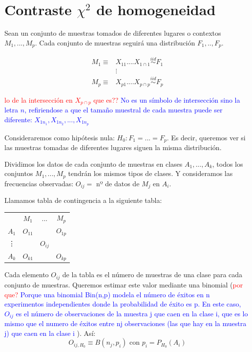 \documentclass[palatino,nochap]{apuntes}
\begin{document}
\section{Contraste $\chi^2$ de homogeneidad}
Sean un conjunto de muestras tomados de diferentes lugares o contextos $M_1,...,M_p$. Cada conjunto de muestras seguirá una distribución $F_1,..,F_p$.

\begin{align*}
M_1 \equiv & X_{11} .... X_{1\cap 1} \stackrel{iid}{\sim} F_1 \\
& \vdots \\
M_p \equiv & X_{p1} .... X_{p\cap p} \stackrel{iid}{\sim} F_p
\end{align*}

\textcolor{red}{lo de la intersección en $X_{p\cap p}$ que es??}
\textcolor{blue}{No es un símbolo de intersección sino la letra $n$, refiriendose a que el tamaño muestral de cada muestra puede ser diferente: $X_{1n_1},X_{1n_2},...,X_{1n_p}$}

Consideraremos como hipótesis nula: $H_0: F_1=...=F_p$. Es decir, queremos ver si las muestras tomadas de diferentes lugares siguen la misma distribución.

Dividimos los datos de cada conjunto de muestras en clases $A_1,...,A_k$, todos los conjuntos $M_1,...,M_p$ tendrán los mismos tipos de clases. Y consideramos las frecuencias observadas: $O_{ij}=$ nº de datos de $M_j$ en $A_i$.

Llamamos tabla de contingencia a la siguiente tabla:

\begin{tabular}{cccc}
& $M_1$ & ... & $M_p$ \\
$A_1$ & $O_{11}$ &  & $O_{1p}$ \\
\vdots &  & $O_{ij}$ &  \\
$A_k$ & $O_{k1}$ &  & $O_{kp}$ \\
\end{tabular}

Cada elemento $O_{ij}$ de la tabla es el número de muestras de una clase para cada conjunto de muestras. Queremos estimar este valor mediante una binomial (\textcolor{red}{por que?} \textcolor{blue}{ Porque una binomial Bin(n,p) modela el número de éxitos en n experimentos independientes donde la probabilidad de éxito es p. En este caso, $O_{ij}$ es el número de observaciones de la muestra j que caen en la clase i, que es lo mismo que el numero de éxitos entre nj observaciones (las que hay en la muestra j) que caen en la clase i }). Así:
$$ O_{ij,H_0} \equiv B(n_j, p_i)  \text{ con } p_i=P_{H_0}(A_i)$$
\end{document}
